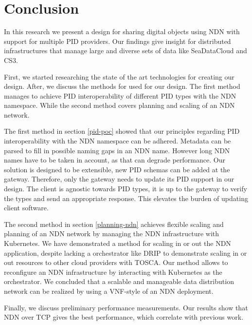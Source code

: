 \section{Conclusion}\label{conc}
In this research we present a design for sharing digital objects using NDN with support for multiple PID providers. Our findings give insight for distributed infrastructures that manage large and diverse sets of data like SeaDataCloud and CS3. 

First, we started researching the state of the art technologies for creating our design. After, we discuss the methods for used for our design. The first method manages to achieve PID interoperability of different PID types with the NDN namespace. While the second method covers planning and scaling of an NDN network. 

The first method in section \ref{pid-poc} showed that our principles regarding PID interoperability with the NDN namespace can be adhered. Metadata can be parsed to fill in possible naming gaps in an NDN name. However long NDN names have to be taken in account, as that can degrade performance. 
Our solution is designed to be extensible, new PID schemas can be added at the gateway. Therefore, only the gateway needs to update its PID support in our design. The client is agnostic towards PID types, it is up to the gateway to verify the types and send an appropriate response. This elevates the burden of updating client software.

The second method in section \ref{planning-ndn} achieves flexible scaling and planning of an NDN network by managing the NDN infrastructure with Kubernetes. We have demonstrated a method for scaling in or out the NDN application, despite lacking a orchestrator like DRIP to demonstrate scaling in or out resources to other cloud providers with TOSCA. Our method allows to reconfigure an NDN infrastructure 
by interacting with Kubernetes as the orchestrator.
We concluded that a scalable and manageable data distribution network can be realized by using a VNF-style of an NDN deployment. 

Finally, we discuss preliminary performance measurements. Our results show that NDN over TCP gives the best performance, which correlate with previous work.

